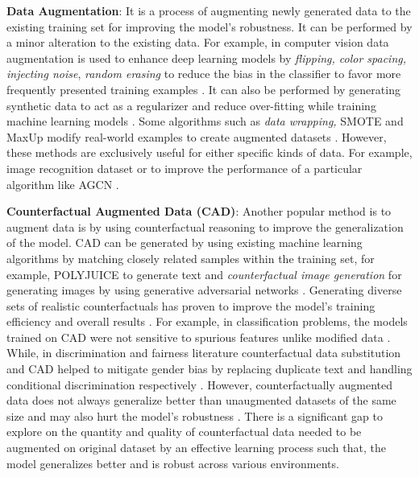 \textbf{Data Augmentation}: It is a process of augmenting newly generated
data to the existing training set for improving the model's robustness.
It can be performed by a minor alteration to the existing data. For
example, in computer vision data augmentation is used to enhance deep
learning models by \textit{flipping, color spacing, injecting noise},\textit{
random erasing} to reduce the bias in the classifier to favor more
frequently presented training examples \cite{hernandez2018data,devries2017improved}.
It can also be performed by generating synthetic data to act as a
regularizer and reduce over-fitting while training machine learning
models \cite{shorten2019survey}. Some algorithms such as \textit{data
wrapping,} SMOTE and MaxUp modify real-world examples to create augmented
datasets \cite{baird1992document,chawla2002smote,gong2021maxup}.
However, these methods are exclusively useful for either specific
kinds of data. For example, image recognition dataset or to improve
the performance of a particular algorithm like AGCN \cite{walawalkar2020attentive}.

\textbf{Counterfactual Augmented Data (CAD)}: Another popular method
is to augment data is by using counterfactual reasoning to improve
the generalization of the model. CAD can be generated by using existing
machine learning algorithms by matching closely related samples within
the training set, for example, POLYJUICE to generate text and\textit{
counterfactual image generation} for generating images by using generative
adversarial networks \cite{wu2021polyjuice,neal2018open}. Generating
diverse sets of realistic counterfactuals has proven to improve the
model's training efficiency and overall results \cite{mothilal2020explaining}.
For example, in classification problems, the models trained on CAD
were not sensitive to spurious features unlike modified data \cite{kaushik2019learning,chang2021towards}.
While, in discrimination and fairness literature counterfactual data
substitution and CAD helped to mitigate gender bias by replacing duplicate
text and handling conditional discrimination respectively \cite{maudslay2019s,vzliobaite2011handling}.
However, counterfactually augmented data does not always generalize
better than unaugmented datasets of the same size and may also hurt
the model's robustness \cite{huang2020counterfactually}. There is
a significant gap to explore on the quantity and quality of counterfactual
data needed to be augmented on original dataset by an effective learning
process such that, the model generalizes better and is robust across
various environments.

